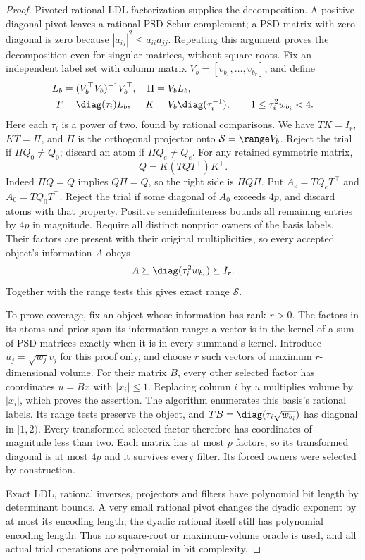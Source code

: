 \begin{proof}
Pivoted rational LDL factorization supplies the decomposition. A positive
diagonal pivot leaves a rational PSD Schur complement; a PSD matrix with
zero diagonal is zero because $|a_{ij}|^2\le a_{ii}a_{jj}$. Repeating this
argument proves the decomposition even for singular matrices, without square
roots. Fix an independent label set with column matrix
$V_b=[v_{b_1},\ldots,v_{b_r}]$, and define
\begin{align}
 L_b&=(V_b^\top V_b)^{-1}V_b^\top,&\Pi&=V_bL_b,\nonumber\\
 T&=\diag(\tau_i)L_b,&K&=V_b\diag(\tau_i^{-1}),
 \qquad 1\le\tau_i^2w_{b_i}<4.
 \label{eq:spectral-normalization}
\end{align}
Here each $\tau_i$ is a power of two, found by rational comparisons. We have
$TK=I_r$, $KT=\Pi$, and $\Pi$ is the orthogonal projector onto
$\mathcal S=\range V_b$. Reject the trial if $\Pi Q_0\ne Q_0$; discard
an atom if $\Pi Q_e\ne Q_e$. For any retained symmetric matrix,
\begin{equation}
 Q=K(TQT^\top)K^\top.
 \label{eq:spectral-reconstruction}
\end{equation}
Indeed $\Pi Q=Q$ implies $Q\Pi=Q$, so the right side is $\Pi Q\Pi$.
Put $A_e=TQ_eT^\top$ and $A_0=TQ_0T^\top$. Reject the trial if some
diagonal of $A_0$ exceeds $4p$, and discard atoms with that property.
Positive semidefiniteness bounds all remaining entries by $4p$ in magnitude.
Require all distinct nonprior owners of the basis labels. Their factors are present with their original multiplicities,
so every accepted object's information $A$ obeys
\begin{equation}
 A\succeq\diag(\tau_i^2w_{b_i})\succeq I_r.
 \label{eq:forced-lower-floor}
\end{equation}
Together with the range tests this gives exact range $\mathcal S$.

To prove coverage, fix an object whose information has rank $r>0$. The
factors in its atoms and prior span its information range: a vector is in
the kernel of a sum of PSD matrices exactly when it is in every summand's
kernel. Introduce $u_j=\sqrt{w_j}v_j$ for this proof only, and choose $r$
such vectors of maximum $r$-dimensional volume. For their matrix $B$, every
other selected factor has coordinates $u=Bx$ with $|x_i|\le1$. Replacing
column $i$ by $u$ multiplies volume by $|x_i|$, which proves the assertion.
The algorithm enumerates this basis's rational labels. Its range tests
preserve the object, and $TB=\diag(\tau_i\sqrt{w_{b_i}})$ has diagonal in
$[1,2)$. Every transformed selected factor therefore has coordinates of
magnitude less than two. Each matrix has at most $p$ factors, so its
transformed diagonal is at most $4p$ and it survives every filter. Its forced
owners were selected by construction.

Exact LDL, rational inverses, projectors and filters have polynomial bit
length by determinant bounds. A very small rational pivot changes the dyadic
exponent by at most its encoding length; the dyadic rational itself still
has polynomial encoding length. Thus no square-root or maximum-volume oracle
is used, and all actual trial operations are polynomial in bit complexity.
\end{proof}

